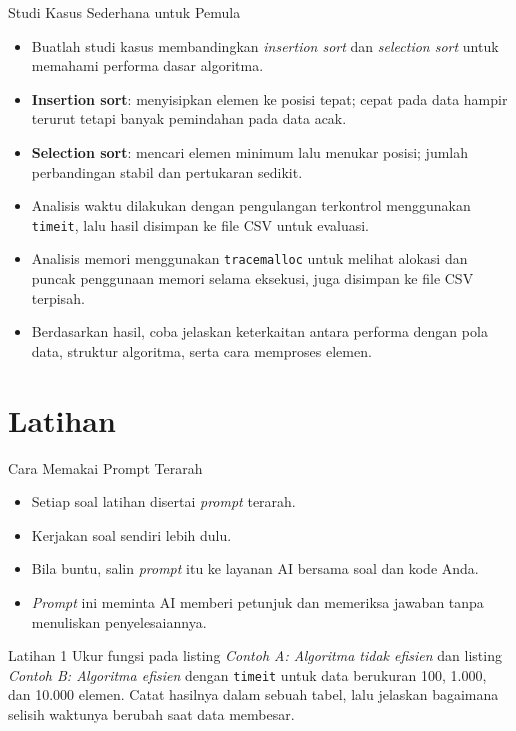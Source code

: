 \documentclass[aspectratio=169, table]{beamer}
\begin{document}
\begin{frame}[fragile]{Studi Kasus Sederhana untuk Pemula}
\vspace{20pt}

\begin{itemize}
    \item Buatlah studi kasus membandingkan \textit{insertion sort} dan \textit{selection sort} untuk memahami performa dasar algoritma.
    \item \textbf{Insertion sort}: menyisipkan elemen ke posisi tepat; cepat pada data hampir terurut tetapi banyak pemindahan pada data acak.
    \item \textbf{Selection sort}: mencari elemen minimum lalu menukar posisi; jumlah perbandingan stabil dan pertukaran sedikit.
    \item Analisis waktu dilakukan dengan pengulangan terkontrol menggunakan \texttt{timeit}, lalu hasil disimpan ke file CSV untuk evaluasi.
    \item Analisis memori menggunakan \texttt{tracemalloc} untuk melihat alokasi dan puncak penggunaan memori selama eksekusi, juga disimpan ke file CSV terpisah.
    \item Berdasarkan hasil, coba jelaskan keterkaitan antara performa dengan pola data, struktur algoritma, serta cara memproses elemen.
\end{itemize}

\end{frame}

\section{Latihan}
\begin{frame}{Cara Memakai Prompt Terarah}
\begin{itemize}
\item Setiap soal latihan disertai \textit{prompt} terarah.
\item Kerjakan soal sendiri lebih dulu.
\item Bila buntu, salin \textit{prompt} itu ke layanan AI bersama soal dan kode Anda.
\item \textit{Prompt} ini meminta AI memberi petunjuk dan memeriksa jawaban tanpa menuliskan penyelesaiannya.
\end{itemize}
\end{frame}

\begin{frame}[fragile,allowframebreaks=0.8]{Latihan 1}
\footnotesize
Ukur fungsi pada listing \textit{Contoh A: Algoritma tidak efisien} dan listing \textit{Contoh B: Algoritma efisien} dengan \texttt{timeit} untuk data berukuran 100, 1.000, dan 10.000 elemen. Catat hasilnya dalam sebuah tabel, lalu jelaskan bagaimana selisih waktunya berubah saat data membesar.
\end{frame}
\end{document}
